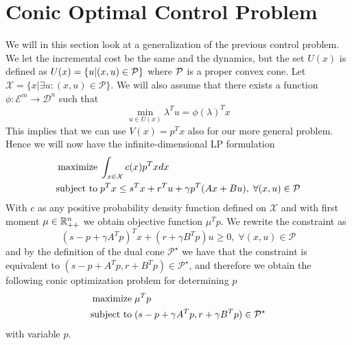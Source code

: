 \documentclass{article}
\begin{document}
\section{Conic Optimal Control Problem}
%
We will in this section look at a generalization of the previous control problem. 
We let the incremental cost be the same and the dynamics, but the set $U(x)$ is defined
as
%
$U(x)=\{u|(x,u)\in \cal P\}$
%
where $\cal P$ is a proper convex cone. Let $\mathcal X=\{x|\exists u: (x,u)\in\mathcal P\}$.
We will also assume that there exists a function
$\phi:{\mathcal E}^m\rightarrow{\mathcal D}^n$ such that
%
$$\min_{u\in U(x)}\lambda^Tu=\phi(\lambda)^Tx$$
%
This implies that we can use  $V(x)=p^Tx$ also for our more general 
problem. Hence we will now have the infinite-dimensional LP formulation
%
\begin{align*}
\mbox{maximize}\;&\int_{x\in \mathcal X}c(x)p^Txdx\\
\mbox{subject to} \;&p^Tx\leq s^Tx+r^Tu+\gamma p^T(Ax+Bu),\;\forall (x,u)\in \mathcal P
\end{align*}
%
With $c$ as any positive probability density function defined on $\mathcal X$ and with 
first moment $\mu\in\mathbb{R}_{++}^n$ we obtain objective function $\mu^Tp$. We rewrite the
constraint as
%
$$(s-p+\gamma A^Tp)^Tx+(r+\gamma B^Tp)u\geq 0,\;\forall (x,u)\in \mathcal P$$
%
and by the definition of the dual cone $\mathcal P^\star$ we have that the 
constraint is equivalent to $(s-p+A^Tp,r+B^Tp)\in\mathcal P^\star$, and therefore
we obtain the following conic optimization problem for determining $p$
%
\begin{align*}
\mbox{maximize}\;&\mu^Tp\\
\mbox{subject to} \;&(s-p+\gamma A^Tp,r+\gamma B^Tp)\in\mathcal P^\star
\end{align*}
%
with variable $p$.
%
\end{document}

